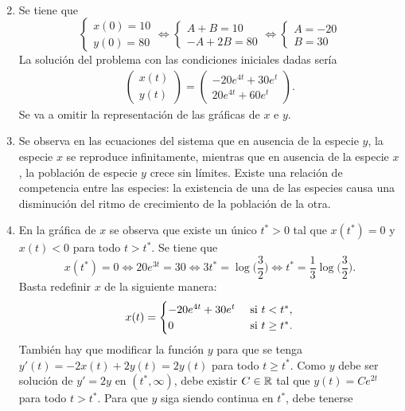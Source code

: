 \documentclass[11pt]{report}
\begin{document}
\begin{solution}
\begin{enumerate}
\begin{align*}
        \end{align*}
        \item Se tiene que
        \[\begin{cases}
            x(0) = 10 \\
            y(0) = 80
        \end{cases} \iff \begin{cases}
            A+B=10 \\
            -A+2B = 80
        \end{cases} \iff \begin{cases}
            A = -20 \\
            B = 30
        \end{cases}\]
        La solución del problema con las condiciones iniciales dadas sería
        \begin{align*}
        \left(\begin{array}{c}
            x(t) \\
            y(t)
        \end{array}\right) = \left(\begin{array}{cc}
            -20e^{4t}+30e^t \\
            20e^{4t}+60e^t
        \end{array}\right).
        \end{align*}
        Se va a omitir la representación de las gráficas de $x$ e $y$.
        \item Se observa en las ecuaciones del sistema que en ausencia de la especie $y$, la especie $x$ se reproduce infinitamente, mientras que en ausencia de la especie $x$, la población de especie $y$ crece sin límites. Existe una relación de competencia entre las especies: la existencia de una de las especies causa una disminución del ritmo de crecimiento de la población de la otra.
        \item En la gráfica de $x$ se observa que existe un único $t^* > 0$ tal que $x(t^*) = 0$ y $x(t) < 0$ para todo $t > t^*$. Se tiene que
        \[x(t^*) = 0 \iff 20e^{3t} = 30 \iff 3t^* = \log\bigl(\frac{3}{2}\bigr) \iff t^* = \frac{1}{3}\log\bigl(\frac{3}{2}\bigr).\]
        Basta redefinir $x$ de la siguiente manera:
        \[x(t) = \begin{cases}
            -20e^{4t}+30e^t & $ si $ t < t^*, \\
            0 & $ si $ t \geq t^*.
        \end{cases}\]
        También hay que modificar la función $y$ para que se tenga $y'(t) = -2x(t)+2y(t) = 2y(t)$ para todo $t \geq t^*$. Como $y$ debe ser solución de $y' = 2y$ en $(t^*,\infty)$, debe existir $C\in\mathbb R$ tal que $y(t) = Ce^{2t}$ para todo $t > t^*$. Para que $y$ siga siendo continua en $t^*$, debe tenerse

\end{enumerate}
\end{solution}
\end{document}
